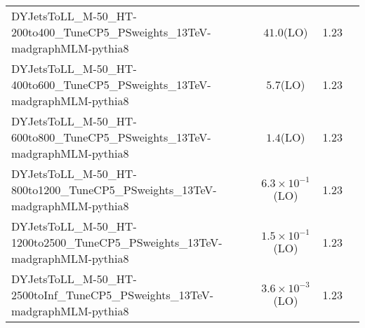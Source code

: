 \begin{tabular}{|l|cc|c|}
    DYJetsToLL\_M-50\_HT-200to400\_TuneCP5\_PSweights\_13TeV-madgraphMLM-pythia8            &     $41.0$(LO)                  & 1.23  \\
    DYJetsToLL\_M-50\_HT-400to600\_TuneCP5\_PSweights\_13TeV-madgraphMLM-pythia8            &     $5.7$(LO)                   & 1.23  \\
    DYJetsToLL\_M-50\_HT-600to800\_TuneCP5\_PSweights\_13TeV-madgraphMLM-pythia8            &     $1.4$(LO)                   & 1.23  \\
    DYJetsToLL\_M-50\_HT-800to1200\_TuneCP5\_PSweights\_13TeV-madgraphMLM-pythia8           &     $6.3\times 10^{-1}$(LO)     & 1.23  \\
    DYJetsToLL\_M-50\_HT-1200to2500\_TuneCP5\_PSweights\_13TeV-madgraphMLM-pythia8          &     $1.5\times 10^{-1}$(LO)     & 1.23  \\
    DYJetsToLL\_M-50\_HT-2500toInf\_TuneCP5\_PSweights\_13TeV-madgraphMLM-pythia8           &     $3.6\times 10^{-3}$(LO)     & 1.23  \\
    \hline
\end{tabular}
